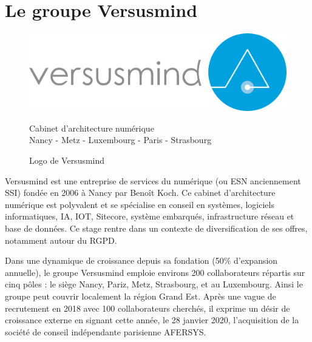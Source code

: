 \documentclass[12pt, a4paper]{report}
\newcommand\tab[1][1cm]{\hspace*{#1}}
\begin{document}
\section{Le groupe Versusmind}
\begin{figure}[H]
    \centering
    \includegraphics[width=.8\textwidth]{versusmind.png}
    \begin{center}
        \color{gray} Cabinet d'architecture numérique\\
        \scriptsize\color{gray}Nancy \hyp{} Metz \hyp{} Luxembourg \hyp{} Paris \hyp{} Strasbourg
    \end{center}
    \caption{Logo de Versusmind}
\end{figure}
\tab{}Versusmind est une entreprise de services du numérique (ou ESN anciennement SSI) fondée en 2006
à Nancy par Benoît Koch. Ce cabinet d’architecture numérique est polyvalent et se spécialise en conseil
en systèmes, logiciels informatiques, IA, IOT, Sitecore, système embarqués, infrastructure réseau et
base de données. Ce stage rentre dans un contexte de diversification de ses offres, notamment autour
du RGPD.\newline

Dans une dynamique de croissance depuis sa fondation (50\% d’expansion annuelle), le groupe
Versusmind emploie environs 200 collaborateurs répartis sur cinq pôles : le siège Nancy, Pariz, Metz,
Strasbourg, et au Luxembourg. Ainsi le groupe peut couvrir localement la région Grand Est. Après une
vague de recrutement en 2018 avec 100 collaborateurs cherchés, il exprime un désir de croissance
externe en signant cette année, le 28 janvier 2020, l’acquisition de la société de conseil indépendante
parisienne AFERSYS.
\end{document}

